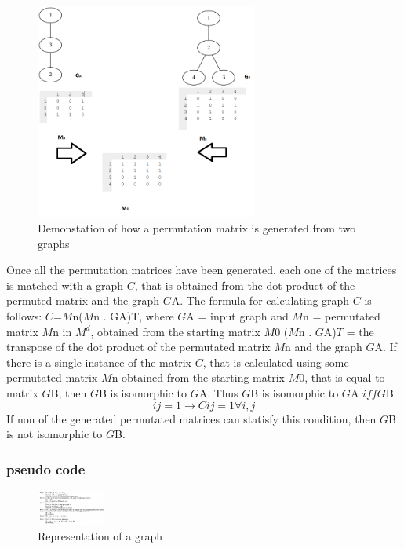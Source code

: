 \begin{figure}[H]
  \begin{center}
      \includegraphics[width=0.65\textwidth]{stratMatrix}
  \end{center}    
  \caption{Demonstation of how a permutation matrix is generated from two graphs} 
  \label{fig:permutationmatrix}
\end{figure} 
Once all the permutation matrices have been generated, each one of the matrices is matched with a graph $C$, that is obtained from the dot product of the permuted matrix and the graph $G${\tiny A}.
The formula for calculating graph $C$ is follows:
$C$=$M${\tiny n}($M${\tiny n} . G{\tiny A})T, where $G${\tiny A} = input graph and  $M${\tiny n} = permutated matrix $M${\tiny n} in $M^d$, obtained from the starting matrix $M0$ ($M${\tiny n} . $G${\tiny A})$T$ = the transpose of the dot product of the permutated matrix $M${\tiny n} and the graph $G${\tiny A}.
If there is a single instance of the matrix $C$, that is calculated using some permutated matrix $M${\tiny n} obtained from the starting matrix $M0$, that is equal to matrix $G${\tiny B}, then $G${\tiny B} is isomorphic to $G${\tiny A}. Thus $G${\tiny B} is isomorphic to $G${\tiny A} $iff G${\tiny B}
  \begin{equation}	
	ij = 1 \rightarrow  Cij = 1 \forall i,j
  \end{equation} 
If non of the generated permutated matrices can statisfy this condition, then $G${\tiny B} is not isomorphic to $G${\tiny B}.

\subsubsection{pseudo code}
	\begin{figure}[H]
	  \begin{center}
		  \includegraphics[width=0.2\textwidth]{Ullmanpseudo}
	  \end{center}    
	  \caption{Representation of a graph}
	  \label{fig:ullmanpseudo}
	\end{figure} 

